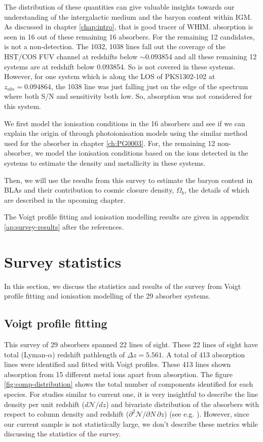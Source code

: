 The distribution of these quantities can give valuable insights towards our understanding of the intergalactic medium and the baryon content within IGM. As discussed in chapter \ref{chap:intro}, that  is good tracer of WHIM.  absorption is seen in 16 out of these remaining 16 absorbers. For the remaining 12 candidates,  is not a non-detection. The  1032, 1038 lines fall out the coverage of the HST/COS FUV channel at redshifts below $\sim 0.093854$ and all these remaining 12 systems are at redshift below 0.093854. So  is not covered in these systems. However, for one system which is along the LOS of PKS1302-102 at $z_{abs}=0.094864$, the  1038 line was just falling just on the edge of the spectrum where both S/N and sensitivity both low. So,  absorption was not considered for this system. 

We first model the ionisation conditions in the 16  absorbers and see if we can explain the origin of  through photoionisation models using the similar method used for the absorber in chapter \ref{ch:PG0003}. For, the remaining 12 non- absorber, we model the ionisation conditions based on the ions detected in the systems to estimate the density and metallicity in these systems. 

Then, we will use the results from this survey to estimate the baryon content in BLAs and their contribution to cosmic closure density, $\Omega_b$, the details of which are described in the upcoming chapter.

The Voigt profile fitting and ionisation modelling results are given in appendix \ref{ap:survey-results} after the references.


\section{Survey statistics}

In this section, we discuss the statistics and results of the survey from Voigt profile fitting and ionisation modelling of the 29 absorber systems.

\subsection{Voigt profile fitting}

This survey of 29 absorbers spanned 22 lines of sight. These 22 lines of sight have total  (Lyman-$\alpha$) redshift pathlength of $\Delta z = 5.561$. A total of 413 absorption lines were identified and fitted with Voigt profiles. These 413 lines shown absorption from 15 different metal ions apart from  absorption. The figure \ref{fig:comp-distribution} shows the total number of components identified for each species. For studies similar to current one, it is very insightful to describe the line density per unit redshift ($d\mathcal{N}/dz$) and  bivariate distribution of the absorbers with respect to column density and redshift ($\partial ^2 \mathcal{N}/\partial N \ \partial z $) (see e.g. \citet{danforth-2016, Penton-2000, tilton_2012}). However, since our current sample is not statistically large, we don't describe these metrics while discussing the statistics of the survey.

